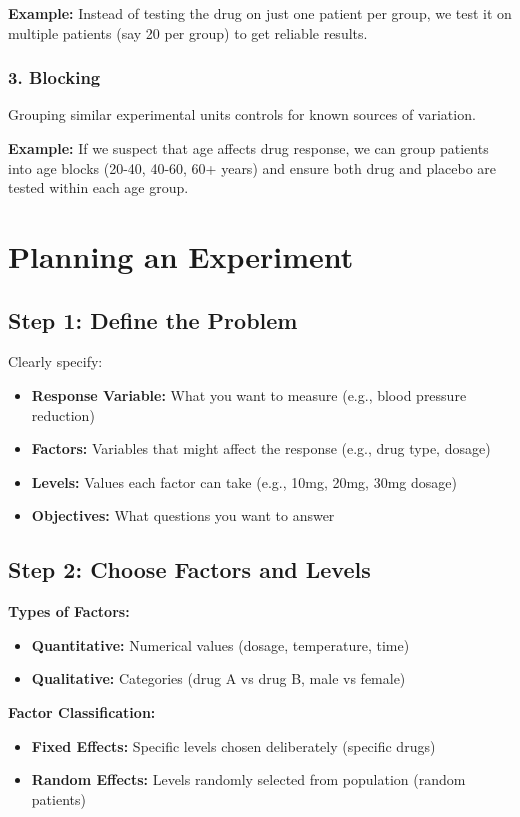 \documentclass[twoside]{book}
\begin{document}
\textbf{Example:} Instead of testing the drug on just one patient per group, we test it on multiple patients (say 20 per group) to get reliable results.

\subsubsection{3. Blocking}
Grouping similar experimental units controls for known sources of variation.

\textbf{Example:} If we suspect that age affects drug response, we can group patients into age blocks (20-40, 40-60, 60+ years) and ensure both drug and placebo are tested within each age group.

\section{Planning an Experiment}

\subsection{Step 1: Define the Problem}

Clearly specify:
\begin{itemize}
    \item \textbf{Response Variable:} What you want to measure (e.g., blood pressure reduction)
    \item \textbf{Factors:} Variables that might affect the response (e.g., drug type, dosage)
    \item \textbf{Levels:} Values each factor can take (e.g., 10mg, 20mg, 30mg dosage)
    \item \textbf{Objectives:} What questions you want to answer
\end{itemize}

\subsection{Step 2: Choose Factors and Levels}

\textbf{Types of Factors:}
\begin{itemize}
    \item \textbf{Quantitative:} Numerical values (dosage, temperature, time)
    \item \textbf{Qualitative:} Categories (drug A vs drug B, male vs female)
\end{itemize}

\textbf{Factor Classification:}
\begin{itemize}
    \item \textbf{Fixed Effects:} Specific levels chosen deliberately (specific drugs)
    \item \textbf{Random Effects:} Levels randomly selected from population (random patients)
\end{itemize}
\end{document}
